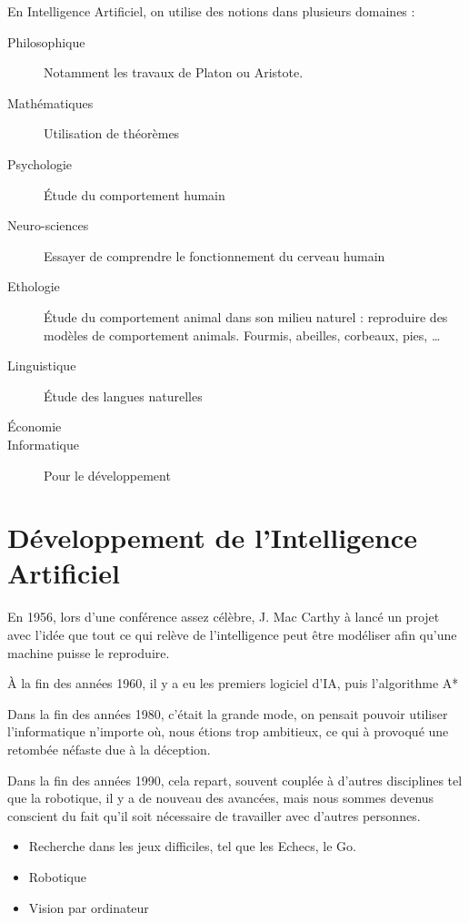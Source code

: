 \documentclass[12pt,a4paper,openany]{book}
\begin{document}
En Intelligence Artificiel, on utilise des notions dans plusieurs domaines : 
\begin{description}
	\item[Philosophique] Notamment les travaux de Platon ou Aristote.
	\item[Mathématiques] Utilisation de théorèmes 
	\item[Psychologie] Étude du comportement humain
	\item[Neuro-sciences] Essayer de comprendre le fonctionnement du cerveau humain
	\item[Ethologie] Étude du comportement animal dans son milieu naturel : reproduire des modèles de comportement animals. Fourmis, abeilles,
		corbeaux, pies, \ldots
	\item[Linguistique] Étude des langues naturelles
	\item[Économie] 
	\item[Informatique] Pour le développement
\end{description}

\section{Développement de l'Intelligence Artificiel}
En 1956, lors d'une conférence assez célèbre, J. Mac Carthy à lancé un projet avec l'idée que tout ce qui relève de l'intelligence peut être modéliser
afin qu'une machine puisse le reproduire.

À la fin des années 1960, il y a eu les premiers logiciel d'IA, puis l'algorithme A*

Dans la fin des années 1980, c'était la grande mode, on pensait pouvoir utiliser l'informatique n'importe où, nous étions trop ambitieux, ce qui à
provoqué une retombée néfaste due à la déception.

Dans la fin des années 1990, cela repart, souvent couplée à d'autres disciplines tel que la robotique, il y a de nouveau des avancées, mais nous
sommes devenus conscient du fait qu'il soit nécessaire de travailler avec d'autres personnes.

\begin{exemple}
	\begin{itemize}
		\item Recherche dans les jeux difficiles, tel que les Echecs, le Go.	
		\item Robotique
		\item Vision par ordinateur
	\end{itemize}
\end{exemple}
\end{document}
